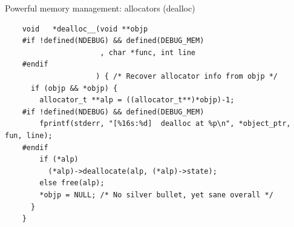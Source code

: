 \begin{frame}[fragile]{Powerful memory management: allocators (dealloc)}

  \begin{lstlisting}
    void   *dealloc__(void **objp
    #if !defined(NDEBUG) && defined(DEBUG_MEM)
                      , char *func, int line
    #endif
                     ) { /* Recover allocator info from objp */
      if (objp && *objp) {
        allocator_t **alp = ((allocator_t**)*objp)-1;
    #if !defined(NDEBUG) && defined(DEBUG_MEM)
        fprintf(stderr, "[%16s:%d]  dealloc at %p\n", *object_ptr, fun, line);
    #endif
        if (*alp)
          (*alp)->deallocate(alp, (*alp)->state);
        else free(alp);
        *objp = NULL; /* No silver bullet, yet sane overall */
      }
    }
  \end{lstlisting}
  
\end{frame}


